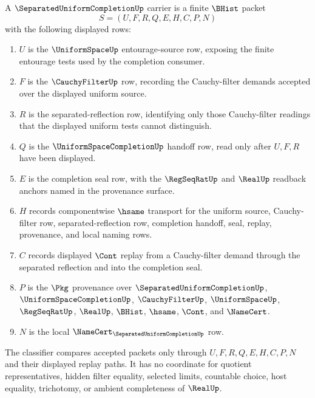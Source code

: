 \begin{definition}
\label{def:separated-uniform-completion-carrier}
A $\SeparatedUniformCompletionUp$ carrier is a finite $\BHist$ packet
$$
S=(U,F,R,Q,E,H,C,P,N)
$$
with the following displayed rows:
\begin{enumerate}
\item $U$ is the $\UniformSpaceUp$ entourage-source row, exposing the finite entourage tests used by the completion consumer.
\item $F$ is the $\CauchyFilterUp$ row, recording the Cauchy-filter demands accepted over the displayed uniform source.
\item $R$ is the separated-reflection row, identifying only those Cauchy-filter readings that the displayed uniform tests cannot distinguish.
\item $Q$ is the $\UniformSpaceCompletionUp$ handoff row, read only after $U,F,R$ have been displayed.
\item $E$ is the completion seal row, with the $\RegSeqRatUp$ and $\RealUp$ readback anchors named in the provenance surface.
\item $H$ records componentwise $\hsame$ transport for the uniform source, Cauchy-filter row, separated-reflection row, completion handoff, seal, replay, provenance, and local naming rows.
\item $C$ records displayed $\Cont$ replay from a Cauchy-filter demand through the separated reflection and into the completion seal.
\item $P$ is the $\Pkg$ provenance over $\SeparatedUniformCompletionUp$, $\UniformSpaceCompletionUp$, $\CauchyFilterUp$, $\UniformSpaceUp$, $\RegSeqRatUp$, $\RealUp$, $\BHist$, $\hsame$, $\Cont$, and $\NameCert$.
\item $N$ is the local $\NameCert_{\SeparatedUniformCompletionUp}$ row.
\end{enumerate}
The classifier compares accepted packets only through $U,F,R,Q,E,H,C,P,N$ and their displayed replay paths. It has no coordinate for quotient representatives, hidden filter equality, selected limits, countable choice, host equality, trichotomy, or ambient completeness of $\RealUp$.
\end{definition}

